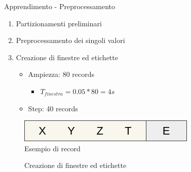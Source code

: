 \begin{tframe}{Apprendimento - Preprocessamento}

    \begin{minipage}{0.64\textwidth}
        \begin{enumerate}
            \item Partizionamenti preliminari
            \item Preprocessamento dei singoli valori
            \item Creazione di finestre ed etichette
                \begin{itemize}
                    \item Ampiezza: 80 records
                        \begin{itemize}
                            \item $T_{finestra} = 0.05 * 80 = 4s$
                        \end{itemize}
                    \item Step: 40 records
                \end{itemize}
    
        \end{enumerate}
    \end{minipage}%
    \hfill
    \begin{minipage}{0.36\textwidth}
        
        \begin{figure}
            \includegraphics[scale = 0.35]{assets/images/classification/record.png}
            \caption*{Esempio di record}
        \end{figure}
        
    \end{minipage}%

    \vspace{3mm}
    \vfill
    \begin{figure}
        
        \caption*{Creazione di finestre ed etichette}
    \end{figure}

\end{tframe}